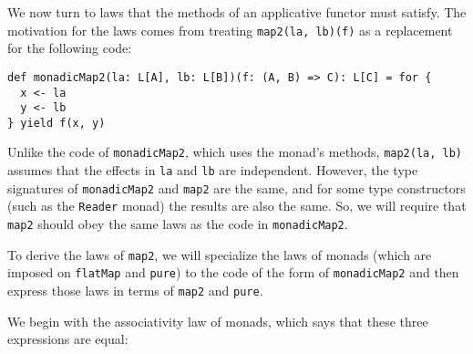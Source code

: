 We now turn to laws that the methods of an applicative functor must
satisfy. The motivation for the laws comes from treating \lstinline!map2(la, lb)(f)!
as a replacement for the following code:
\begin{lstlisting}
def monadicMap2(la: L[A], lb: L[B])(f: (A, B) => C): L[C] = for {
  x <- la
  y <- lb
} yield f(x, y)
\end{lstlisting}
Unlike the code of \lstinline!monadicMap2!, which uses the monad\textsf{'}s
methods, \lstinline!map2(la, lb)! assumes that the effects in \lstinline!la!
and \lstinline!lb! are independent. However, the type signatures
of \lstinline!monadicMap2! and \lstinline!map2! are the same, and
for some type constructors (such as the \lstinline!Reader! monad)
the results are also the same. So, we will require that \lstinline!map2!
should obey the same laws as the code in \lstinline!monadicMap2!.

To derive the laws of \lstinline!map2!, we will specialize the laws
of monads (which are imposed on \lstinline!flatMap! and \lstinline!pure!)
to the code of the form of \lstinline!monadicMap2! and then express
those laws in terms of \lstinline!map2! and \lstinline!pure!.

We begin with the associativity law of monads, which says that these
three expressions are equal:

\vspace{0.2\baselineskip}

